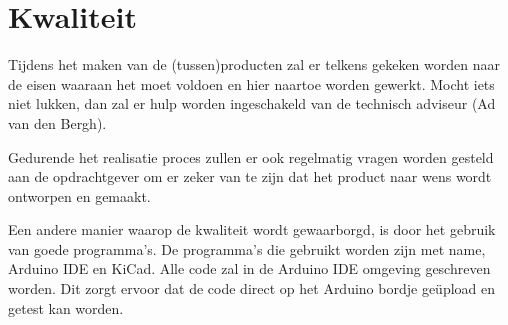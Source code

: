 \section{Kwaliteit}
Tijdens het maken van de (tussen)producten zal er telkens gekeken worden naar de eisen waaraan het moet voldoen en hier naartoe worden gewerkt. Mocht iets niet lukken, dan zal er hulp worden ingeschakeld van de technisch adviseur (Ad van den Bergh).

Gedurende het realisatie proces zullen er ook regelmatig vragen worden gesteld aan de opdrachtgever om er zeker van te zijn dat het product naar wens wordt ontworpen en gemaakt.

Een andere manier waarop de kwaliteit wordt gewaarborgd, is door het gebruik van goede programma’s. De programma’s die gebruikt worden zijn met name, Arduino IDE en KiCad. Alle code zal in de Arduino IDE omgeving geschreven worden. Dit zorgt ervoor dat de code direct op het Arduino bordje geüpload en getest kan worden.
